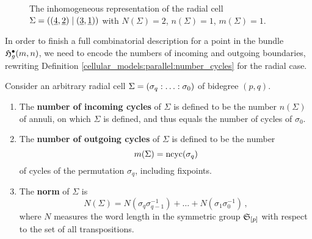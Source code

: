 \begin{figure}[ht]
\centering
{}
\caption{\label{radial:slit_annuli:inhomogeneous_cell} The inhomogeneous representation of the radial cell $\Sigma = ((\underline{\smash{4}}, \underline{\smash{2}})\mid (\underline{\smash{3}}, \underline{\smash{1}}))$ with $N(\Sigma) = 2$, $n(\Sigma) = 1$, $m(\Sigma) = 1$.}
\end{figure}

In order to finish a full combinatorial description for a point in the bundle $\mathfrak{H}^{\bullet}_g(m, n)$, 
we need to encode the numbers of incoming and outgoing boundaries,
rewriting Definition \ref{cellular_models:parallel:number_cycles} for the radial case.

\begin{defi}
    \label{cellular_models:radial:number_cycles}
    \label{cellular_models:radial:number_punctures}
    \label{cellular_models:radial:number_boundaries}
    \label{cellular_models:radial:norm}

    Consider an arbitrary radial cell $\Sigma = \homogq$ of bidegree $(p,q)$.
    \begin{enumerate}
        \item The {\bf number of incoming cycles} of $\Sigma$ is defined to be the number $n(\Sigma)$ of annuli, on which $\Sigma$ is defined,
              and thus equals the number of cycles of $\sigma_0$.
        \item The {\bf number of outgoing cycles} of $\Sigma$ is defined to be the number 
            \[
                m( \Sigma ) = \operatorname{ncyc}( \sigma_q)
            \]
	    of cycles of the permutation $\sigma_q$, including fixpoints.
        \item The {\bf norm} of $\Sigma$ is
            \[
                N(\Sigma) = N(\sigma_q\sigma_{q-1}^{-1}) + \ldots + N(\sigma_1\sigma_0^{-1}) \,,
            \]
            where $N$ measures the word length in the symmetric group $\mathfrak S_{[p]}$ with respect to the set of all transpositions.
    \end{enumerate}
\end{defi}

